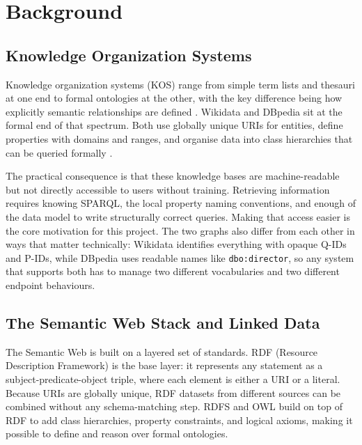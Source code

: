 \documentclass[11pt,a4paper]{article}
\begin{document}
\section{Background}
\label{sec:background}

\subsection{Knowledge Organization Systems}
\label{sec:kos}

Knowledge organization systems (KOS) range from simple term lists and thesauri at one end to formal ontologies at the other, with the key difference being how explicitly semantic relationships are defined \cite{hodge2000kos,zeng2008kos}. Wikidata and DBpedia sit at the formal end of that spectrum. Both use globally unique URIs for entities, define properties with domains and ranges, and organise data into class hierarchies that can be queried formally \cite{vrandecic2014wikidata,lehmann2015dbpedia}.

The practical consequence is that these knowledge bases are machine-readable but not directly accessible to users without training. Retrieving information requires knowing SPARQL, the local property naming conventions, and enough of the data model to write structurally correct queries. Making that access easier is the core motivation for this project. The two graphs also differ from each other in ways that matter technically: Wikidata identifies everything with opaque Q-IDs and P-IDs, while DBpedia uses readable names like \texttt{dbo:director}, so any system that supports both has to manage two different vocabularies and two different endpoint behaviours.

\subsection{The Semantic Web Stack and Linked Data}
\label{sec:linkeddata}

The Semantic Web is built on a layered set of standards. RDF (Resource Description Framework) is the base layer: it represents any statement as a subject-predicate-object triple, where each element is either a URI or a literal. Because URIs are globally unique, RDF datasets from different sources can be combined without any schema-matching step. RDFS and OWL build on top of RDF to add class hierarchies, property constraints, and logical axioms, making it possible to define and reason over formal ontologies.
\end{document}
